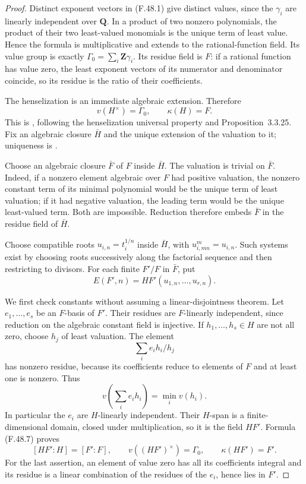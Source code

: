 \begin{proof}
Distinct exponent vectors in (F.48.1) give distinct values, since the \(\gamma_i\) are linearly independent over \(\mathbf Q\). In a product of two nonzero polynomials, the product of their two least-valued monomials is the unique term of least value. Hence the formula is multiplicative and extends to the rational-function field. Its value group is exactly \(\Gamma_0=\sum_i\mathbf Z\gamma_i\). Its residue field is \(F\): if a rational function has value zero, the least exponent vectors of its numerator and denominator coincide, so its residue is the ratio of their coefficients.

The henselization is an immediate algebraic extension. Therefore
\[
                 v(H^\times)=\Gamma_0,\qquad \kappa(H)=F.
 \tag{F.48.5}
\]
This is \citet[Corollary~3.3.26, author-PDF p.~125]{F_ADH2017}, following the henselization universal property and Proposition~3.3.25. Fix an algebraic closure \(\bar H\) and the unique extension of the valuation to it; uniqueness is \citet[Proposition~3.3.11(ii), author-PDF pp.~119--121]{F_ADH2017}.

Choose an algebraic closure \(\bar F\) of \(F\) inside \(\bar H\). The valuation is trivial on \(\bar F\). Indeed, if a nonzero element algebraic over \(F\) had positive valuation, the nonzero constant term of its minimal polynomial would be the unique term of least valuation; if it had negative valuation, the leading term would be the unique least-valued term. Both are impossible. Reduction therefore embeds \(\bar F\) in the residue field of \(\bar H\).

Choose compatible roots \(u_{i,n}=t_i^{1/n}\) inside \(\bar H\), with \(u_{i,mn}^{m}=u_{i,n}\). Such systems exist by choosing roots successively along the factorial sequence and then restricting to divisors. For each finite \(F'/F\) in \(\bar F\), put
\[
             E(F',n)=HF'(u_{1,n},\ldots,u_{r,n}).
 \tag{F.48.6}
\]

We first check constants without assuming a linear-disjointness theorem. Let \(e_1,\ldots,e_s\) be an \(F\)-basis of \(F'\). Their residues are \(F\)-linearly independent, since reduction on the algebraic constant field is injective. If \(h_1,\ldots,h_s\in H\) are not all zero, choose \(h_j\) of least valuation. The element
\[
          \sum_i e_i h_i/h_j
\]
has nonzero residue, because its coefficients reduce to elements of \(F\) and at least one is nonzero. Thus
\[
 v\left(\sum_i e_i h_i\right)=\min_i v(h_i).
 \tag{F.48.7}
\]
In particular the \(e_i\) are \(H\)-linearly independent. Their \(H\)-span is a finite-dimensional domain, closed under multiplication, so it is the field \(HF'\). Formula (F.48.7) proves
\[
 [HF':H]=[F':F],\qquad v((HF')^\times)=\Gamma_0,\qquad
                        \kappa(HF')=F'.
 \tag{F.48.8}
\]
For the last assertion, an element of value zero has all its coefficients integral and its residue is a linear combination of the residues of the \(e_i\), hence lies in \(F'\).


\end{proof}
